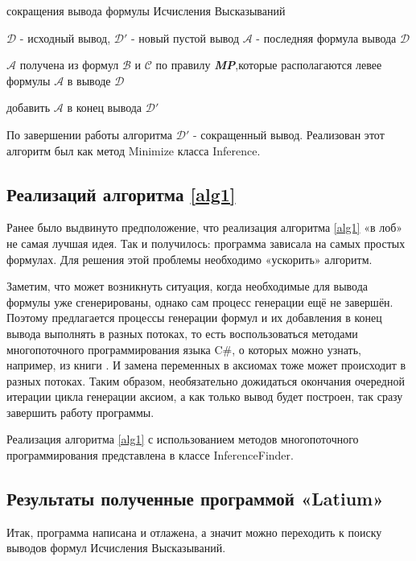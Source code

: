 \documentclass[a4paper,12pt]{article}
\theoremstyle{definition}
\begin{document}
	\begin{algorithm}
	\caption{сокращения вывода формулы Исчисления Высказываний}\label{alg2}
		\begin{algorithmic}[1]
			\State $\mathcal{D}$ - исходный вывод, $\mathcal{D}'$ - новый пустой вывод	
			\State $ \mathcal{A} $ - последняя формула вывода $\mathcal{D}$
			\State {}
			\State 
			\parbox[t]{\dimexpr\linewidth-\algorithmicindent}{ $ \mathcal{A} $ получена из формул $ \mathcal{B} $ и $ \mathcal{C} $ по правилу \textit{\textbf{MP}},\newline которые располагаются левее формулы $\mathcal{A}$ в выводе $\mathcal{D}$ }
			\State {}
			\State {}
			\EndIf	
			\State добавить $ \mathcal{A} $ в конец вывода $\mathcal{D}'$	
			\EndProcedure
		\end{algorithmic}
	\end{algorithm}
	По завершении работы алгоритма $\mathcal{D}'$ - сокращенный вывод.
	Реализован этот алгоритм был как метод Minimize класса Inference.
	
	\subsection{Реализаций алгоритма \ref{alg1}}
	Ранее было выдвинуто предположение, что реализация алгоритма \ref{alg1} «в лоб» не самая лучшая идея. Так и получилось: программа зависала на самых простых формулах. Для решения этой проблемы необходимо «ускорить» алгоритм. 
	
	Заметим, что может возникнуть ситуация, когда необходимые для вывода формулы уже сгенерированы, однако сам процесс генерации ещё не завершён. Поэтому предлагается процессы генерации формул и их добавления в конец вывода выполнять в разных потоках, то есть воспользоваться методами многопоточного программирования языка C\#, о которых можно узнать, например, из книги \cite{YakimovaYaP2}. И замена переменных в аксиомах тоже может происходит в разных потоках. Таким образом, необязательно дожидаться окончания очередной итерации цикла генерации аксиом, а как только вывод будет построен, так сразу завершить работу программы.
	
	Реализация алгоритма \ref{alg1} с использованием методов многопоточного программирования представлена в классе InferenceFinder.
	
	\subsection{Результаты полученные программой «Latium»}
	Итак, программа написана и отлажена, а значит можно переходить к поиску выводов формул Исчисления Высказываний.
	
\end{document}

